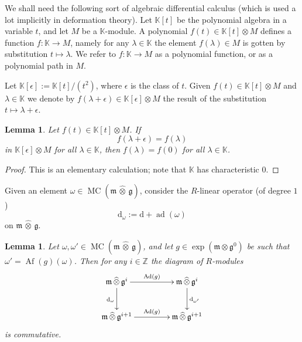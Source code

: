 \documentclass[a4paper,10pt]{amsart}
\newtheorem{lem}[equation]{Lemma}
\theoremstyle{definition}
\numberwithin{equation}{section}
\newcommand{\opn}{\operatorname}
\newcommand{\mfrak}[1]{\mathfrak{#1}}
\newcommand{\mrm}[1]{\mathrm{#1}}
\newcommand{\mbb}[1]{\mathbb{#1}}
\newcommand{\what}[1]{\widehat{#1}}
\newcommand{\hatotimes}{\, \what{\otimes} \,}
\newcommand{\K}{\mbb{K}}
\newcommand{\Z}{\mbb{Z}}
\newcommand{\g}{\mfrak{g}}
\newcommand{\m}{\mfrak{m}}
\renewcommand{\d}{\mrm{d}}
\newcommand{\om}{\omega}
\newcommand{\ep}{\epsilon}
\newcommand{\la}{\lambda}
\begin{document}
We shall need the following sort of algebraic differential calculus
(which is used a lot implicitly in deformation theory).
Let $\K[t]$ be the polynomial algebra in a variable $t$, and let $M$ be a
$\K$-module. A polynomial 
$f(t) \in \K[t] \otimes M$ defines a 
function $f : \K \to M$, namely for any $\la \in \K$ the element
$f(\la) \in M$ is gotten by substitution $t \mapsto \la$.
We refer to $f : \K \to M$ as a polynomial function, or as 
a polynomial path in $M$. 

Let $\K[\ep] := \K[t] / (t^2)$, where $\ep$ is the class of $t$. 
Given $f(t) \in \K[t] \otimes M$ and $\la \in \K$ we denote by 
$f(\la + \ep) \in \K[\ep] \otimes M$ the result of the substitution 
$t \mapsto \la + \ep$.

\begin{lem} \label{lem:7}
Let $f(t) \in \K[t] \otimes M$. If 
\[ f(\la + \ep)  = f(\la) \]
in $\K[\ep] \otimes M$ for all $\la \in \K$, then $f(\la) = f(0)$
for all $\la \in \K$.
\end{lem}

\begin{proof}
This is an elementary calculation; note that $\K$ has characteristic $0$.
\end{proof}

Given an element $\om \in \opn{MC}(\m \hatotimes \g)$, consider the 
$R$-linear operator (of degree $1$)
\begin{equation} \label{eqn:17}
 \d_{\om} := \d + \opn{ad}(\om) 
\end{equation}
on $\m \hatotimes \g$.

\begin{lem} \label{lem:3}
Let $\om, \om' \in \opn{MC}(\m \hatotimes \g)$,
and let $g \in \opn{exp}(\m \otimes \g^0)$ be such that
$\om' = \opn{Af}(g)(\om)$. 
Then for any $i \in \Z$ the diagram of $R$-modules
\[ \UseTips \xymatrix @C=10ex @R=6ex {
\m \hatotimes \g^{i}
\ar[r]^{\opn{Ad}(g)}
\ar[d]_{\d_{\om}}
&
\m \hatotimes \g^{i}
\ar[d]^{\d_{\om'}}
\\
\m \hatotimes \g^{i+1}
\ar[r]^{\opn{Ad}(g)}
&
\m \hatotimes \g^{i+1}
} \]
is commutative.
\end{lem}
\end{document}

